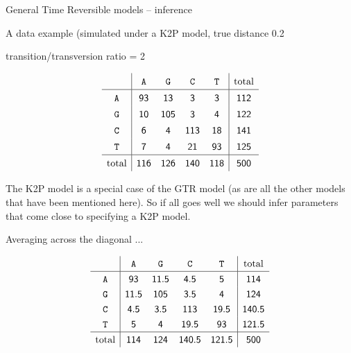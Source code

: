 \documentclass[bluish,slideColor,colorBG,pdf]{prosper}
\begin{document}
\begin{slide}[Replace]{General Time Reversible models -- inference}

\centerline{A data example (simulated under a K2P model, true distance 0.2}
\centerline{transition/transversion ratio = 2}

\begin{center} 
\[
\renewcommand{\arraystretch}{1.4}
\begin{array}{c | c c c c | c} 
     & {\tt A} & {\tt G} & {\tt C} & {\tt T} & {\rm total} \\
\hline
{\tt A \raisebox{3pt}{\strut}} & \mathsf{93} & \mathsf{13} & \mathsf{3} & \mathsf{3} & \mathsf{112}\\
{\tt G} & \mathsf{10} & \mathsf{105} & \mathsf{3} & \mathsf{4} & \mathsf{122}\\
{\tt C} & \mathsf{6} & \mathsf{4} & \mathsf{113} & \mathsf{18} & \mathsf{141}\\
{\tt T} & \mathsf{7} & \mathsf{4} & \mathsf{21} & \mathsf{93} & \mathsf{125}\\
\hline
{\rm total} & \mathsf{116} & \mathsf{126} & \mathsf{140} & \mathsf{118} & \mathsf{500}
\end{array}
\]
\end{center}
\bigskip

The K2P model is a special case of the GTR model (as are all the other models
that have been mentioned here).  So if all goes well we should infer parameters
that come close to specifying a K2P model.

\end{slide}

\begin{slide}[Replace]{Averaging across the diagonal ... }

\begin{center}
\[
\renewcommand{\arraystretch}{1.3}
\begin{array}{c | c c c c | c}
     & {\tt A} & {\tt G} & {\tt C} & {\tt T} & {\rm total} \\
\hline
{\tt A} & \mathsf{93} & \mathsf{11.5} & \mathsf{4.5} & \mathsf{5} & \mathsf{114}\\
{\tt G} & \mathsf{11.5} & \mathsf{105} & \mathsf{3.5} & \mathsf{4} & \mathsf{124}\\
{\tt C} & \mathsf{4.5} & \mathsf{3.5} & \mathsf{113} & \mathsf{19.5} & \mathsf{140.5}\\
{\tt T} & \mathsf{5} & \mathsf{4} & \mathsf{19.5} & \mathsf{93} & \mathsf{121.5}\\
\hline
{\rm total} & \mathsf{114} & \mathsf{124} & \mathsf{140.5} & \mathsf{121.5} & \mathsf{500}
\end{array}
\]
\end{center}

\end{slide}
\end{document}
